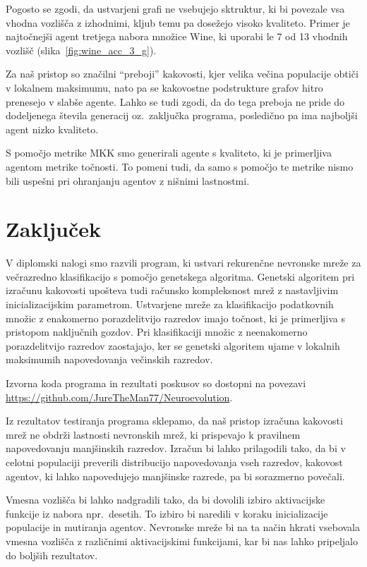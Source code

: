 \documentclass[a4paper,12pt,openright]{book}
\begin{document}
    Pogosto se zgodi, da ustvarjeni grafi ne vsebujejo sktruktur, ki bi povezale vsa vhodna vozlišča z izhodnimi, kljub temu pa dosežejo visoko kvaliteto.
    Primer je najtočnejši agent tretjega nabora množice Wine, ki uporabi le 7 od 13 vhodnih vozlišč (slika~\ref{fig:wine_acc_3_g}).

    Za naš pristop so značilni \enquote{preboji} kakovosti, kjer velika večina populacije obtiči v lokalnem maksimumu,
    nato pa se kakovostne podstrukture grafov hitro prenesejo v slabše agente.
    Lahko se tudi zgodi, da do tega preboja ne pride do dodeljenega števila generacij oz.\ zaključka programa, posledično pa ima najboljši agent nizko kvaliteto.

    S pomočjo metrike MKK smo generirali agente s kvaliteto, ki je primerljiva agentom metrike točnosti.
    To pomeni tudi, da samo s pomočjo te metrike nismo bili uspešni pri ohranjanju agentov z nišnimi lastnostmi.


    \chapter{Zaključek}\label{ch:zakljucki-sklep}
    V diplomski nalogi smo razvili program, ki ustvari rekurenčne nevronske mreže za večrazredno klasifikacijo s pomočjo genetskega algoritma.
    Genetski algoritem pri izračunu kakovosti upošteva tudi računsko kompleksnost mrež z nastavljivim inicializacijskim parametrom.
    Ustvarjene mreže za klasifikacijo podatkovnih množic z enakomerno porazdelitvijo razredov imajo točnost, ki je primerljiva s
    pristopom naključnih gozdov.
    Pri klasifikaciji množic z neenakomerno porazdelitvijo razredov zaostajajo, ker se genetski
    algoritem ujame v lokalnih maksimumih napovedovanja večinskih razredov.

    Izvorna koda programa in rezultati poskusov so dostopni na povezavi \url{https://github.com/JureTheMan77/Neuroevolution}.

    Iz rezultatov testiranja programa sklepamo, da naš pristop izračuna kakovosti mrež ne obdrži lastnosti
    nevronskih mrež, ki prispevajo k pravilnem napovedovanju manjšinskih razredov.
    Izračun bi lahko prilagodili tako, da bi v celotni populaciji preverili distribucijo napovedovanja vseh razredov,
    kakovost agentov, ki lahko napovedujejo manjšinske razrede, pa bi sorazmerno povečali.

    Vmesna vozlišča bi lahko nadgradili tako, da bi dovolili izbiro aktivacijske funkcije iz nabora npr.\ desetih.
    To izbiro bi naredili v koraku inicializacije populacije in mutiranja agentov.
    Nevronske mreže bi na ta način hkrati vsebovala vmesna vozlišča z različnimi aktivacijskimi funkcijami, kar bi nas
    lahko pripeljalo do boljših rezultatov.
\end{document}
